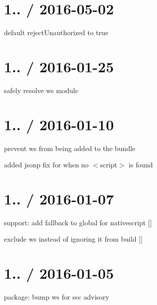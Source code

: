 \section*{1.. / 2016-\/05-\/02 }


\begin{DoxyItemize}
\item default {\ttfamily reject\+Unauthorized} to {\ttfamily true}
\end{DoxyItemize}

\section*{1.. / 2016-\/01-\/25 }


\begin{DoxyItemize}
\item safely resolve {\ttfamily ws} module
\end{DoxyItemize}

\section*{1.. / 2016-\/01-\/10 }


\begin{DoxyItemize}
\item prevent {\ttfamily ws} from being added to the bundle
\item added jsonp fix for when no {\ttfamily $<$script$>$} is found
\end{DoxyItemize}

\section*{1.. / 2016-\/01-\/07 }


\begin{DoxyItemize}
\item support\+: add fallback to {\ttfamily global} for nativescript \mbox{[}\mbox{]}
\item exclude {\ttfamily ws} instead of ignoring it from build \mbox{[}\mbox{]}
\end{DoxyItemize}

\section*{1.. / 2016-\/01-\/05 }


\begin{DoxyItemize}
\item package\+: bump {\ttfamily ws} for sec advisory
\end{DoxyItemize}

